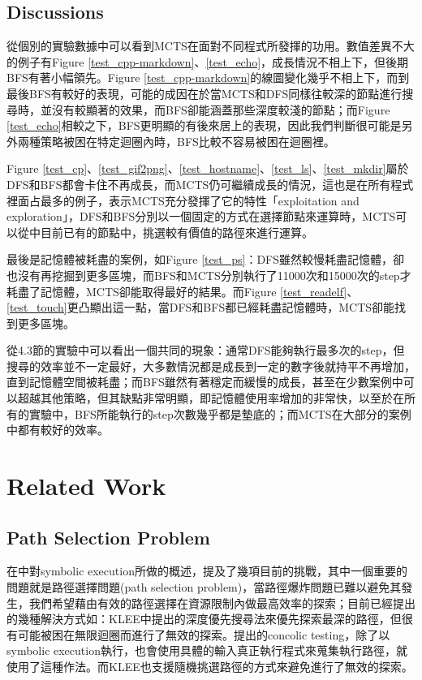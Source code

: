 \documentclass[12pt,a4paper,oneside]{book}
\begin{document}
\section{Discussions}

從個別的實驗數據中可以看到MCTS在面對不同程式所發揮的功用。數值差異不大的例子有Figure \ref{test_cpp-markdown}、\ref{test_echo}，成長情況不相上下，但後期BFS有著小幅領先。Figure \ref{test_cpp-markdown}的線圖變化幾乎不相上下，而到最後BFS有較好的表現，可能的成因在於當MCTS和DFS同樣往較深的節點進行搜尋時，並沒有較顯著的效果，而BFS卻能涵蓋那些深度較淺的節點；而Figure \ref{test_echo}相較之下，BFS更明顯的有後來居上的表現，因此我們判斷很可能是另外兩種策略被困在特定迴圈內時，BFS比較不容易被困在迴圈裡。

Figure \ref{test_cp}、\ref{test_gif2png}、\ref{test_hostname}、\ref{test_ls}、\ref{test_mkdir}屬於DFS和BFS都會卡住不再成長，而MCTS仍可繼續成長的情況，這也是在所有程式裡面占最多的例子，表示MCTS充分發揮了它的特性「exploitation and exploration」，DFS和BFS分別以一個固定的方式在選擇節點來運算時，MCTS可以從中目前已有的節點中，挑選較有價值的路徑來進行運算。

最後是記憶體被耗盡的案例，如Figure \ref{test_ps}：DFS雖然較慢耗盡記憶體，卻也沒有再挖掘到更多區塊，而BFS和MCTS分別執行了11000次和15000次的step才耗盡了記憶體，MCTS卻能取得最好的結果。而Figure \ref{test_readelf}、\ref{test_touch}更凸顯出這一點，當DFS和BFS都已經耗盡記憶體時，MCTS卻能找到更多區塊。

從4.3節的實驗中可以看出一個共同的現象：通常DFS能夠執行最多次的step，但搜尋的效率並不一定最好，大多數情況都是成長到一定的數字後就持平不再增加，直到記憶體空間被耗盡；而BFS雖然有著穩定而緩慢的成長，甚至在少數案例中可以超越其他策略，但其缺點非常明顯，即記憶體使用率增加的非常快，以至於在所有的實驗中，BFS所能執行的step次數幾乎都是墊底的；而MCTS在大部分的案例中都有較好的效率。

\chapter{Related Work}

\section{Path Selection Problem}

在\cite{sharma2012critical}\cite{schwartz2010all}中對symbolic execution所做的概述，提及了幾項目前的挑戰，其中一個重要的問題就是路徑選擇問題(path selection problem)，當路徑爆炸問題已難以避免其發生，我們希望藉由有效的路徑選擇在資源限制內做最高效率的探索；目前已經提出的幾種解決方式如：KLEE\cite{cadar2008klee}中提出的深度優先搜尋法來優先探索最深的路徑，但很有可能被困在無限迴圈而進行了無效的探索。\cite{sen2007concolic}提出的concolic testing，除了以symbolic execution執行，也會使用具體的輸入真正執行程式來蒐集執行路徑，\cite{sen2005cute}就使用了這種作法。而KLEE\cite{cadar2008klee}也支援隨機挑選路徑的方式來避免進行了無效的探索。
\end{document}
